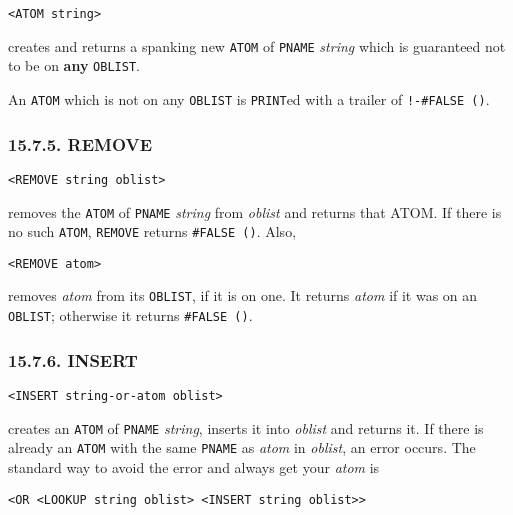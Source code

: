 \documentclass[a4paper,]{article}
\begin{document}
\begin{verbatim}
<ATOM string>
\end{verbatim}

 creates and returns a spanking new \texttt{ATOM} of \texttt{PNAME} \emph{string} which is
guaranteed not to be on \textbf{any} \texttt{OBLIST}.

An \texttt{ATOM} which is not on any \texttt{OBLIST} is \texttt{PRINT}ed with a trailer of \texttt{!-\#FALSE\ ()}.

\subsubsection{15.7.5. REMOVE}\label{remove}

\begin{verbatim}
<REMOVE string oblist>
\end{verbatim}

 removes the \texttt{ATOM} of \texttt{PNAME} \emph{string} from \emph{oblist} and returns
that ATOM. If there is no such \texttt{ATOM}, \texttt{REMOVE} returns \texttt{\#FALSE\ ()}. Also,

\begin{verbatim}
<REMOVE atom>
\end{verbatim}

removes \emph{atom} from its \texttt{OBLIST}, if it is on one. It returns \emph{atom} if it was on an \texttt{OBLIST};
otherwise it returns \texttt{\#FALSE\ ()}.

\subsubsection{15.7.6. INSERT}\label{insert}

\begin{verbatim}
<INSERT string-or-atom oblist>
\end{verbatim}

 creates an \texttt{ATOM} of \texttt{PNAME} \emph{string}, inserts it into \emph{oblist} and
returns it. If there is already an \texttt{ATOM} with the same \texttt{PNAME} as \emph{atom} in \emph{oblist}, an error
occurs. The standard way to avoid the error and always get your \emph{atom} is

\begin{verbatim}
<OR <LOOKUP string oblist> <INSERT string oblist>>
\end{verbatim}
\end{document}
